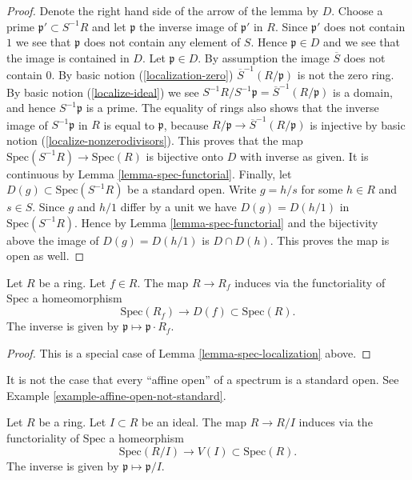 \begin{proof}
Denote the right hand side of the arrow of the lemma by $D$.
Choose a prime $\mathfrak p' \subset S^{-1}R$ and let $\mathfrak p$
the inverse image of $\mathfrak p'$ in $R$. Since $\mathfrak p'$
does not contain $1$ we see that $\mathfrak p$ does not contain
any element of $S$. Hence $\mathfrak p \in D$ and we see that
the image is contained in $D$. Let $\mathfrak p \in D$.
By assumption the image $\overline{S}$ does not contain $0$.
By basic notion (\ref{localization-zero})
$\overline{S}^{-1}(R/\mathfrak p)$ is not the zero ring.
By basic notion (\ref{localize-ideal}) we see
$S^{-1}R / S^{-1}\mathfrak p = \overline{S}^{-1}(R/\mathfrak p)$
is a domain, and hence $S^{-1}\mathfrak p$ is a prime.
The equality of rings also shows that the inverse image of
$S^{-1}\mathfrak p$ in $R$ is equal to $\mathfrak p$,
because $R/\mathfrak p \to \overline{S}^{-1}(R/\mathfrak p)$
is injective by basic notion (\ref{localize-nonzerodivisors}).
This proves that the map $\text{Spec}(S^{-1}R) \to \text{Spec}(R)$
is bijective onto $D$ with inverse as given.
It is continuous by Lemma \ref{lemma-spec-functorial}.
Finally, let $D(g) \subset \text{Spec}(S^{-1}R)$ be a standard
open. Write $g = h/s$ for some $h\in R$ and $s\in S$.
Since $g$ and $h/1$ differ by a unit we have $D(g) = 
D(h/1)$ in $\text{Spec}(S^{-1}R)$.
Hence by Lemma \ref{lemma-spec-functorial} and the bijectivity
above the image of $D(g) = D(h/1)$ is $D \cap D(h)$.
This proves the map is open as well.
\end{proof}

\begin{lemma}
\label{lemma-standard-open}
Let $R$ be a ring. Let $f \in R$.
The map $R \to R_f$ induces via the functoriality of
$\text{Spec}$ a homeomorphism
$$
\text{Spec}(R_f) \longrightarrow D(f) \subset \text{Spec}(R).
$$
The inverse is given by $\mathfrak p \mapsto \mathfrak p \cdot R_f$.
\end{lemma}

\begin{proof}
This is a special case of Lemma \ref{lemma-spec-localization}
above.
\end{proof}

\noindent
It is not the case that every ``affine open'' of a
spectrum is a standard open. See
Example \ref{example-affine-open-not-standard}.

\begin{lemma}
\label{lemma-spec-closed}
Let $R$ be a ring. Let $I \subset R$ be an ideal.
The map $R \to R/I$ induces via the functoriality of
$\text{Spec}$ a homeorphism
$$
\text{Spec}(R/I) \longrightarrow V(I) \subset \text{Spec}(R).
$$
The inverse is given by $\mathfrak p \mapsto \mathfrak p / I$.
\end{lemma}

